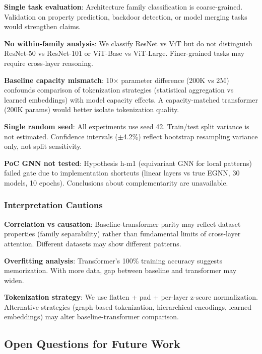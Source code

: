 \textbf{Single task evaluation}: Architecture family classification is coarse-grained. Validation on property prediction, backdoor detection, or model merging tasks would strengthen claims.

\textbf{No within-family analysis}: We classify ResNet vs ViT but do not distinguish ResNet-50 vs ResNet-101 or ViT-Base vs ViT-Large. Finer-grained tasks may require cross-layer reasoning.

\textbf{Baseline capacity mismatch}: 10$\times$ parameter difference (200K vs 2M) confounds comparison of tokenization strategies (statistical aggregation vs learned embeddings) with model capacity effects. A capacity-matched transformer (200K params) would better isolate tokenization quality.

\textbf{Single random seed}: All experiments use seed 42. Train/test split variance is not estimated. Confidence intervals ($\pm$4.2\%) reflect bootstrap resampling variance only, not split sensitivity.

\textbf{PoC GNN not tested}: Hypothesis h-m1 (equivariant GNN for local patterns) failed gate due to implementation shortcuts (linear layers vs true EGNN, 30 models, 10 epochs). Conclusions about complementarity are unavailable.

\subsubsection{Interpretation Cautions}

\textbf{Correlation vs causation}: Baseline-transformer parity may reflect dataset properties (family separability) rather than fundamental limits of cross-layer attention. Different datasets may show different patterns.

\textbf{Overfitting analysis}: Transformer's 100\% training accuracy suggests memorization. With more data, gap between baseline and transformer may widen.

\textbf{Tokenization strategy}: We use flatten + pad + per-layer z-score normalization. Alternative strategies (graph-based tokenization, hierarchical encodings, learned embeddings) may alter baseline-transformer comparison.

\subsection{Open Questions for Future Work}

